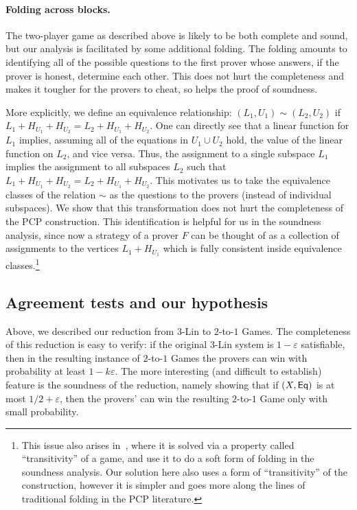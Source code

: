 \documentclass[11pt]{article}
\numberwithin{equation}{section}
\theoremstyle{definition}
\theoremstyle{plain}
\newcommand\eps{\varepsilon}
\def\V{\mathcal{V}}
\begin{document}
\paragraph{Folding across blocks.} The two-player game as described above is likely to be both complete and sound, but our analysis is facilitated by some additional folding. The folding amounts to identifying all of the possible questions to the first prover whose answers, if the prover is honest, determine each other. This does not hurt the completeness and makes it tougher for the provers to cheat, so helps the proof of soundness.

More explicitly, we define an equivalence relationship: $(L_1,U_1)\sim (L_2,U_2)$ if $L_1 + H_{U_1} + H_{U_2} = L_2 + H_{U_1} + H_{U_2}$.
One can directly see that a linear function for $L_1$ implies, assuming all of the equations in $U_1\cup U_2$ hold, the value of the linear function on $L_2$, and vice versa.
Thus, the assignment to a single subspace $L_1$ implies the assignment to all subspaces $L_2$ such that $L_1 + H_{U_1} + H_{U_2} = L_2 + H_{U_1} + H_{U_2}$. This motivates us to take the equivalence classes of the relation $\sim$ as the questions to the provers (instead of individual subspaces). We show that
this transformation does not hurt the completeness of the PCP construction. This identification is helpful for us in the soundness analysis,
since now a strategy of a prover $F$ can be thought of as a collection of assignments to the vertices $L_1 + H_{U_1}$ which is fully consistent inside equivalence classes.\footnote{This issue also arises in~\cite{KMS}, %
where  %
it is solved via a property called ``transitivity'' of a game, and use it to
do a soft form of folding in the soundness analysis. Our solution here also uses a 
form of ``transitivity'' of the construction, however it
is simpler and goes more along the lines of traditional folding in the PCP literature.}

\subsection{Agreement tests and our hypothesis}
\def\V{{\cal V}}
\def\D{{\cal D}}
\def\Vsat{\V_{sat}}
\def\S{\mathcal{S}}
%

Above, we described our reduction from $3$-Lin to $2$-to-$1$ Games. The completeness of
this reduction is easy to verify: if the original $3$-Lin system is $1-\eps$ satisfiable,
then in the resulting instance of $2$-to-$1$ Games the provers can win with probability
at least $1-k\eps$. The more interesting (and difficult to establish) feature is the soundness of
the reduction, namely showing that if $(X, {\sf Eq})$ is at most $1/2 + \eps$, then the
provers' can win the resulting $2$-to-$1$ Game only with small probability.
\end{document}
